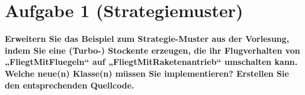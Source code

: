\section{Aufgabe 1 (Strategiemuster)}
\textbf{Erweitern Sie das Beispiel zum Strategie-Muster aus der Vorlesung, indem Sie eine (Turbo-)
Stockente erzeugen, die ihr Flugverhalten von „FliegtMitFluegeln“ auf
„FliegtMitRaketenantrieb“ umschalten kann. Welche neue(n) Klasse(n) müssen Sie
implementieren? Erstellen Sie den entsprechenden Quellcode.}

\clearpage
